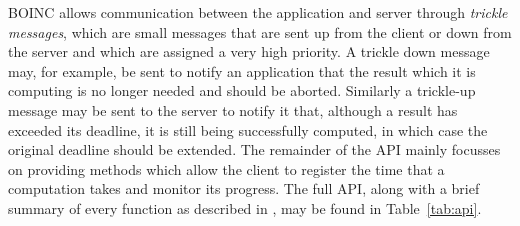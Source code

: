 BOINC  allows communication between the application and server through \emph{trickle messages}, which are small messages that are sent up from the client or down from the server and which are assigned a very high priority. A trickle down message may, for example, be sent to notify an application that the result which it is computing is no longer needed and should be aborted. Similarly a trickle-up message may be sent to the server to notify it that, although a result  has exceeded its deadline, it is still being successfully computed, in which case the original deadline should be extended.
The remainder of the API mainly focusses on providing methods which allow the client  to register the time that a computation takes and monitor its progress. The full API, along with a brief summary of every function as described in \cite{boincwiki}, may be found in Table~\ref{tab:api}.


 
